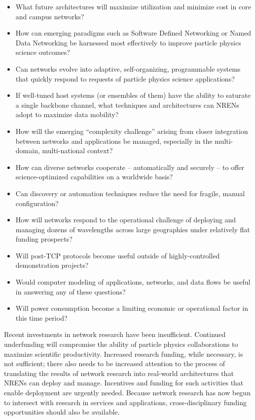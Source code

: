 \begin{itemize}
\item What future architectures will maximize utilization and minimize cost in core and campus networks?
\item How can emerging paradigms such as Software Defined Networking or Named Data Networking be harnessed most effectively to improve particle physics science outcomes?
\item Can networks evolve into adaptive, self-organizing, programmable systems that quickly respond to requests of particle physics science applications? 
\item If well-tuned host systems (or ensembles of them) have the ability to saturate a single backbone channel, what techniques and architectures can NRENs adopt to maximize data mobility?
\item How will the emerging “complexity challenge” arising from closer integration between networks and applications be managed, especially in the multi-domain, multi-national context?
\item How can diverse networks cooperate – automatically and securely – to offer science-optimized capabilities on a worldwide basis? 
\item Can discovery or automation techniques reduce the need for fragile, manual configuration? 
\item How will networks respond to the operational challenge of deploying  and managing dozens of wavelengths across large geographies under relatively flat funding prospects? 
\item Will post-TCP protocols become useful outside of highly-controlled demonstration projects? 
\item Would computer modeling of applications, networks, and data flows be useful in answering any of these questions?  
\item Will power consumption become a limiting economic or operational factor in this time period? 
\end{itemize}

Recent investments in network research have been insufficient.  Continued underfunding will compromise the ability of particle physics collaborations to maximize scientific productivity. Increased research funding, while necessary, is not sufficient; there also needs to be increased attention to the process of translating the results of network research into real-world architectures that NRENs can deploy and manage. Incentives and funding for such activities that enable deployment
are urgently needed. Because network research has now begun to intersect with research in services and applications, cross-disciplinary funding opportunities should also be available.  

